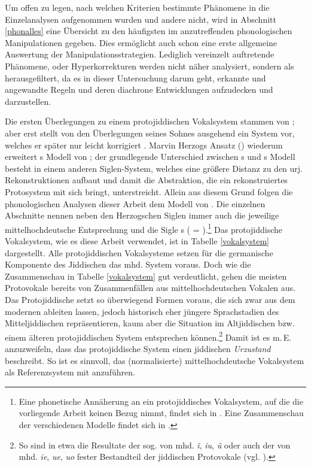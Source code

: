  
Um offen zu legen, nach welchen Kriterien bestimmte Phänomene in die Einzelanalysen aufgenommen wurden und andere nicht, wird in Abschnitt \ref{phonalles} eine Übersicht zu den häufigsten im  anzutreffenden phonologischen Manipulationen gegeben. Dies ermöglicht auch schon eine erste allgemeine Auswertung der Manipulationsstrategien. Lediglich vereinzelt auftretende Phänomene,  oder Hyperkorrekturen werden nicht näher analysiert, sondern als  herausgefiltert, da es in dieser Untersuchung darum geht, erkannte und angewandte Regeln und deren diachrone Entwicklungen aufzudecken und darzustellen.   
 
 Die ersten Überlegungen zu einem protojiddischen Vokalsystem stammen von \textcite[251–254]{WeinreichU1958};  aber erst \textcite{Weinreich1960} stellt von den Überlegungen seines Sohnes ausgehend ein System vor, welches er später nur leicht korrigiert \parencite[658–718]{Weinreich1973}. Marvin Herzogs Ansatz (\citeyear{Herzog1965}) wiederum erweitert \citeauthor{Weinreich1960}s Modell von \citeyear{Weinreich1960}; der grundlegende Unterschied zwischen \citeauthor{Weinreich1960}s und \citeauthor{Herzog1965}s Modell besteht in einem anderen Siglen-System, welches eine größere Distanz zu den urj. Rekonstruktionen aufbaut und damit die Abstraktion, die ein rekonstruiertes Protosystem mit sich bringt, unterstreicht. Allein aus diesem Grund folgen die phonologischen Analysen dieser Arbeit dem Modell von  \textcite[161–205]{Herzog1965}. Die einzelnen Abschnitte nennen neben den Herzogschen Siglen immer auch die jeweilige mittelhochdeutsche Entsprechung und die Sigle \citeauthor{Weinreich1973}s  (\cite[658–718]{Weinreich1973} = ).\footnote{Eine phonetische Annäherung an ein protojiddisches Vokalsystem, auf die die vorliegende Arbeit keinen Bezug nimmt, findet sich in \textcite{Jacobs1990}. Eine Zusammenschau der verschiedenen Modelle findet sich in \textcite[insbes. S. 86 Tabelle 18]{Beider2010}.} Das protojiddische Vokalsystem, wie es diese Arbeit verwendet, ist in Tabelle \ref{vokalsystem} dargestellt. Alle protojiddischen Vokalsysteme setzen für die germanische Komponente des Jiddischen das mhd. System voraus. Doch wie die Zusammenschau in Tabelle \ref{vokalsystem} gut verdeutlicht, gehen die meisten Protovokale bereits von Zusammenfällen aus mittelhochdeutschen Vokalen aus. Das Protojiddische setzt so überwiegend Formen voraus, die sich zwar aus dem modernen   ableiten lassen, jedoch historisch eher jüngere Sprachstadien des Mitteljiddischen repräsentieren, kaum aber die Situation im Altjiddischen bzw. einem älteren protojiddischen System entsprechen können.\footnote{So sind in etwa die Resultate der sog.  von mhd. \textit{î}, \textit{iu}, \textit{û} oder auch der  von mhd. \textit{ie}, \textit{ue}, \textit{uo} fester Bestandteil der jiddischen Protovokale (vgl. \cite[§L17]{Paul2007}).} Damit ist es m.\,E. anzuzweifeln, dass das protojiddische System einen jiddischen \textit{Urzustand} beschreibt. So ist es sinnvoll, das (normalisierte) mittelhochdeutsche Vokalsystem als Referenzsystem mit anzuführen.
 
